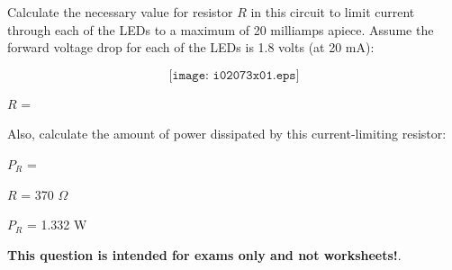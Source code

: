 

Calculate the necessary value for resistor $R$ in this circuit to limit current through each of the LEDs to a maximum of 20 milliamps apiece.  Assume the forward voltage drop for each of the LEDs is 1.8 volts (at 20 mA):

$$\texttt{[image: i02073x01.eps]}$$

$R$ = 

\vskip 10pt

Also, calculate the amount of power dissipated by this current-limiting resistor:

\vskip 10pt

$P_R$ = 

\vskip 10pt







$R$ = 370 $\Omega$

\vskip 10pt

$P_R$ = 1.332 W







{\bf This question is intended for exams only and not worksheets!}.


